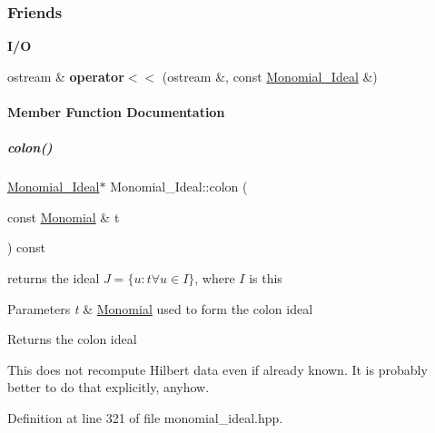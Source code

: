 \subsubsection*{Friends}
\begin{Indent}\textbf{ I/O}\par
\begin{DoxyCompactItemize}
\item 
\mbox{\label{group__polygroup_afcb33f97b01be14e0eefe468fe752b7b}} 
ostream \& {\bfseries operator$<$$<$} (ostream \&, const \hyperlink{group__polygroup_class_monomial___ideal}{Monomial\+\_\+\+Ideal} \&)
\end{DoxyCompactItemize}
\end{Indent}


\paragraph{Member Function Documentation}
\mbox{\label{group__polygroup_a708f7bc64b3e5d5ac3ea8e3b0cb15769}} 
\subparagraph{\texorpdfstring{colon()}{colon()}}
{\footnotesize\ttfamily \hyperlink{group__polygroup_class_monomial___ideal}{Monomial\+\_\+\+Ideal}$\ast$ Monomial\+\_\+\+Ideal\+::colon (\begin{DoxyParamCaption}\item[{const \hyperlink{group__polygroup_class_monomial}{Monomial} \&}]{t }\end{DoxyParamCaption}) const\hspace{0.3cm}{\ttfamily [inline]}}



returns the ideal $J=\{u:t \forall u\in I\}$, where $I$ is {\ttfamily this} 


\begin{DoxyParams}{Parameters}
{\em t} & \hyperlink{group__polygroup_class_monomial}{Monomial} used to form the colon ideal \\
\hline
\end{DoxyParams}
\begin{DoxyReturn}{Returns}
the colon ideal
\end{DoxyReturn}
This does not recompute Hilbert data even if already known. It is probably better to do that explicitly, anyhow. 

Definition at line 321 of file monomial\+\_\+ideal.\+hpp.

